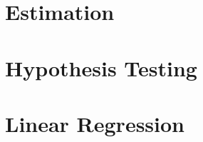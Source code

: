 \documentclass[british,11pt,a4paper]{report}
\begin{document}
\maketitle
\tableofcontents

\chapter{Estimation}

\chapter{Hypothesis Testing}

\chapter{Linear Regression}

\end{document}
